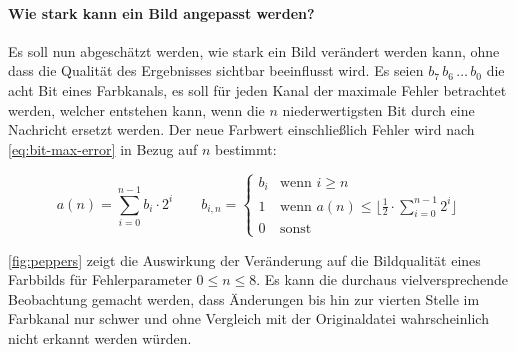 \paragraph{Wie stark kann ein Bild angepasst werden?}
Es soll nun abgeschätzt werden, wie stark ein Bild verändert
werden kann, ohne dass die Qualität des Ergebnisses sichtbar beeinflusst
wird. Es seien $b_7\,b_6\, \ldots \,b_0$ die acht Bit eines Farbkanals, es soll für
jeden Kanal der maximale Fehler betrachtet werden, welcher entstehen kann,
wenn die $n$ niederwertigsten Bit durch eine Nachricht ersetzt werden.
Der neue Farbwert einschließlich Fehler wird nach \eqref{eq:bit-max-error} in Bezug auf $n$ bestimmt:

\begin{equation}
  a(n) = \sum_{i=0}^{n - 1} b_i \cdot 2^i \qquad
  b_{i, n} =
  \begin{cases}
    b_i & \text{wenn $i \geq n$}                                                           \\
    1   & \text{wenn $a(n) \leq \lfloor \frac{1}{2} \cdot \sum_{i=0}^{n - 1} 2^i$} \rfloor \\
    0   & \text{sonst}
  \end{cases}
  \label{eq:bit-max-error}
\end{equation}

\noindent
\autoref{fig:peppers} zeigt die Auswirkung der Veränderung auf die Bildqualität
eines Farbbilds für Fehlerparameter $0 \leq n \leq 8$.
Es kann die durchaus vielversprechende Beobachtung
gemacht werden, dass Änderungen bis hin zur vierten Stelle im Farbkanal nur schwer und
ohne Vergleich mit der Originaldatei wahrscheinlich nicht erkannt werden würden.
\newpage

